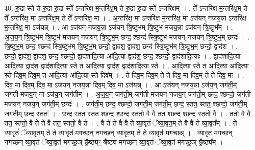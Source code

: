 \documentclass[17pt]{extarticle}
\begin{document}
40. रु॒द्रा स्ते ते रु॒द्रा रु॒द्रा स्ते᳚ ऽन्तरि॑क्ष म॒न्तरि॑क्ष॒म् ते रु॒द्रा रु॒द्रा स्ते᳚ ऽन्तरि॑क्षम् । . ते᳚ ऽन्तरि॑क्ष म॒न्तरि॑क्ष॒म् ते ते᳚ ऽन्तरि॑क्ष॒ मा ऽन्तरि॑क्ष॒म् ते ते᳚ ऽन्तरि॑क्ष॒ मा । . अ॒न्तरि॑क्ष॒ मा ऽन्तरि॑क्ष म॒न्तरि॑क्ष॒ मा ऽज॑यन् नजय॒न्ना ऽन्तरि॑क्ष म॒न्तरि॑क्ष॒ मा ऽज॑यन्न् । . आ ऽज॑यन् नजय॒न्ना ऽज॑यन् त्रि॒ष्टुभ॑म् त्रि॒ष्टुभ॑ मजय॒न्ना ऽज॑यन् त्रि॒ष्टुभ᳚म् । . अ॒ज॒य॒न् त्रि॒ष्टुभ॑म् त्रि॒ष्टुभ॑ मजयन् नजयन् त्रि॒ष्टुभ॒म् छन्द॒ श्छन्द॑ स्त्रि॒ष्टुभ॑ मजयन् नजयन् त्रि॒ष्टुभ॒म् छन्दः॑ । . त्रि॒ष्टुभ॒म् छन्द॒ श्छन्द॑ स्त्रि॒ष्टुभ॑म् त्रि॒ष्टुभ॒म् छन्दो॒ द्वाद॑श॒ द्वाद॑श॒ छन्द॑ स्त्रि॒ष्टुभ॑म् त्रि॒ष्टुभ॒म् छन्दो॒ द्वाद॑श । . छन्दो॒ द्वाद॑श॒ द्वाद॑श॒ छन्द॒ श्छन्दो॒ द्वाद॑शादि॒त्या आ॑दि॒त्या द्वाद॑श॒ छन्द॒ श्छन्दो॒ द्वाद॑शादि॒त्याः । . द्वाद॑शादि॒त्या आ॑दि॒त्या द्वाद॑श॒ द्वाद॑शादि॒त्या स्ते त आ॑दि॒त्या द्वाद॑श॒ द्वाद॑शादि॒त्या स्ते । . आ॒दि॒त्या स्ते त आ॑दि॒त्या आ॑दि॒त्या स्ते दिव॒म् दिव॒म् त आ॑दि॒त्या आ॑दि॒त्या स्ते दिव᳚म् । . ते दिव॒म् दिव॒म् ते ते दिव॒ मा दिव॒म् ते ते दिव॒ मा । . दिव॒ मा दिव॒म् दिव॒ मा ऽज॑यन् नजय॒न्ना दिव॒म् दिव॒ मा ऽज॑यन्न् । . आ ऽज॑यन् नजय॒न्ना ऽज॑य॒न् जग॑ती॒म् जग॑ती मजय॒न् ना ऽज॑य॒न् जग॑तीम् । . अ॒ज॒य॒न् जग॑ती॒म् जग॑ती मजयन् नजय॒न् जग॑ती॒म् छन्द॒ श्छन्दो॒ जग॑ती मजयन् नजय॒न् जग॑ती॒म् छन्दः॑ । . जग॑ती॒म् छन्द॒ श्छन्दो॒ जग॑ती॒म् जग॑ती॒म् छन्द॒ स्तत॒ स्तत॒ श्छन्दो॒ जग॑ती॒म् जग॑ती॒म् छन्द॒ स्ततः॑ । . छन्द॒ स्तत॒ स्तत॒ श्छन्द॒ श्छन्द॒ स्ततो॒ वै वै तत॒ श्छन्द॒ श्छन्द॒ स्ततो॒ वै । . ततो॒ वै वै तत॒ स्ततो॒ वै ते ते वै तत॒ स्ततो॒ वै ते । . वै ते ते वै वै ते व्या॒वृतं॑ ॅव्या॒वृत॒म् ते वै वै ते व्या॒वृत᳚म् । . ते व्या॒वृतं॑ ॅव्या॒वृत॒म् ते ते व्या॒वृत॑ मगच्छन् नगच्छन् व्या॒वृत॒म् ते ते व्या॒वृत॑ मगच्छन्न् । . व्या॒वृत॑ मगच्छन् नगच्छन् व्या॒वृतं॑ ॅव्या॒वृत॑ मगच्छ॒ञ् छ्रैष्ठ्यꣳ॒॒ श्रैष्ठ्य॑ मगच्छन् व्या॒वृतं॑ ॅव्या॒वृत॑ मगच्छ॒ञ् छ्रैष्ठ्य᳚म् । \newline
\end{document}
